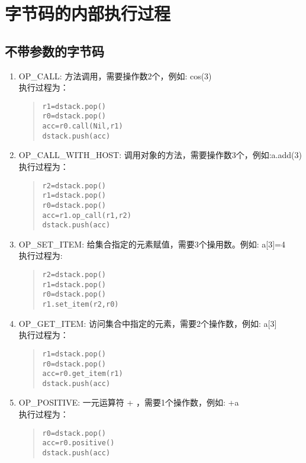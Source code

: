 \section{字节码的内部执行过程}
\subsection{不带参数的字节码}
\begin{enumerate}
\item OP\_CALL: 方法调用，需要操作数2个，例如: cos(3) \\
执行过程为：
\begin{quote}
\begin{verbatim}
r1=dstack.pop()
r0=dstack.pop()
acc=r0.call(Nil,r1)
dstack.push(acc)
\end{verbatim}
\end{quote}

\item OP\_CALL\_WITH\_HOST: 调用对象的方法，需要操作数3个，例如:a.add(3)\\
执行过程为：
\begin{quote}
\begin{verbatim}
r2=dstack.pop()
r1=dstack.pop()
r0=dstack.pop()
acc=r1.op_call(r1,r2)
dstack.push(acc)
\end{verbatim}
\end{quote}

\item OP\_SET\_ITEM: 给集合指定的元素赋值，需要3个操用数。例如: a[3]=4  \\
执行过程为: 
\begin{quote}
\begin{verbatim}
r2=dstack.pop()
r1=dstack.pop()
r0=dstack.pop()
r1.set_item(r2,r0)
\end{verbatim}
\end{quote}

\item OP\_GET\_ITEM: 访问集合中指定的元素，需要2个操作数，例如: a[3] \\
执行过程为：
\begin{quote}
\begin{verbatim}
r1=dstack.pop()
r0=dstack.pop()
acc=r0.get_item(r1)
dstack.push(acc)
\end{verbatim}
\end{quote}

\item OP\_POSITIVE: 一元运算符 + ，需要1个操作数，例如: +a \\
执行过程为：
\begin{quote}
\begin{verbatim}
r0=dstack.pop()
acc=r0.positive()
dstack.push(acc) 
\end{verbatim}
\end{quote}


\end{enumerate}
